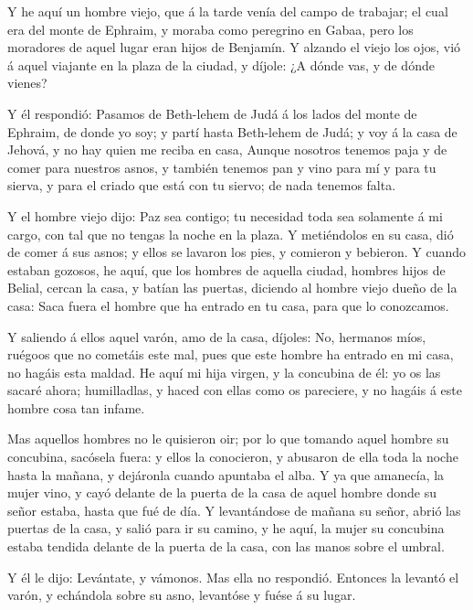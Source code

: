  Y he aquí un hombre viejo, que á la tarde venía del campo
de trabajar; el cual era del monte de Ephraim, y moraba como peregrino
en Gabaa, pero los moradores de aquel lugar eran hijos de Benjamín.
 Y alzando el viejo los ojos, vió á aquel viajante en la
plaza de la ciudad, y díjole: ¿A dónde vas, y de dónde vienes?

 Y él respondió: Pasamos de Beth-lehem de Judá á los lados
del monte de Ephraim, de donde yo soy; y partí hasta Beth-lehem de Judá;
y voy á la casa de Jehová, y no hay quien me reciba en casa,
 Aunque nosotros tenemos paja y de comer para nuestros
asnos, y también tenemos pan y vino para mí y para tu sierva, y para el
criado que está con tu siervo; de nada tenemos falta.

 Y el hombre viejo dijo: Paz sea contigo; tu necesidad toda
sea solamente á mi cargo, con tal que no tengas la noche en la plaza.
 Y metiéndolos en su casa, dió de comer á sus asnos; y
ellos se lavaron los pies, y comieron y bebieron.  Y cuando
estaban gozosos, he aquí, que los hombres de aquella ciudad, hombres
hijos de Belial, cercan la casa, y batían las puertas, diciendo al
hombre viejo dueño de la casa: Saca fuera el hombre que ha entrado en tu
casa, para que lo conozcamos.

 Y saliendo á ellos aquel varón, amo de la casa, díjoles:
No, hermanos míos, ruégoos que no cometáis este mal, pues que este
hombre ha entrado en mi casa, no hagáis esta maldad.  He
aquí mi hija virgen, y la concubina de él: yo os las sacaré ahora;
humilladlas, y haced con ellas como os pareciere, y no hagáis á este
hombre cosa tan infame.

 Mas aquellos hombres no le quisieron oir; por lo que
tomando aquel hombre su concubina, sacósela fuera: y ellos la
conocieron, y abusaron de ella toda la noche hasta la mañana, y
dejáronla cuando apuntaba el alba.  Y ya que amanecía, la
mujer vino, y cayó delante de la puerta de la casa de aquel hombre donde
su señor estaba, hasta que fué de día.  Y levantándose de
mañana su señor, abrió las puertas de la casa, y salió para ir su
camino, y he aquí, la mujer su concubina estaba tendida delante de la
puerta de la casa, con las manos sobre el umbral.

 Y él le dijo: Levántate, y vámonos. Mas ella no respondió.
Entonces la levantó el varón, y echándola sobre su asno, levantóse y
fuése á su lugar.

